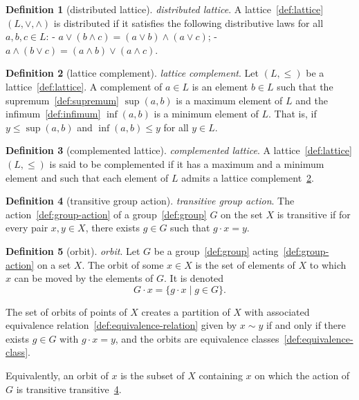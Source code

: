 \documentclass[12pt,a4paper]{article}
\theoremstyle{definition}
\newtheorem{definition}{Definition}
\begin{document}
\begin{definition}[distributed lattice]\label{def:distributed-lattice}
\emph{distributed lattice}. A lattice~\ref{def:lattice} $(L,\lor,\land)$ is distributed if it satisfies the following distributive laws for all $a,b,c\in L$:
- $a\lor (b\land c) = (a\lor b)\land (a\lor c)$;
- $a\land(b\lor c) = (a\land b)\lor (a\land c)$.
\end{definition}

\begin{definition}[lattice complement]\label{def:lattice-complement}
\emph{lattice complement}. Let $(L,\leq)$ be a lattice~\ref{def:lattice}. A complement of $a\in L$ is an element $b\in L$ such that the supremum~\ref{def:supremum} $\sup(a,b)$ is a maximum element of $L$ and the infimum~\ref{def:infimum} $\inf(a,b)$ is a minimum element of $L$. That is, if $y\leq \sup(a,b)$ and $\inf(a,b)\leq y$ for all $y\in L$.
\end{definition}

\begin{definition}[complemented lattice]\label{def:complemented-lattice}
\emph{complemented lattice}. A lattice~\ref{def:lattice} $(L,\leq)$ is said to be complemented if it has a maximum and a minimum element and such that each element of $L$ admits a lattice complement~\ref{def:lattice-complement}.
\end{definition}

\begin{definition}[transitive group action]\label{def:transitive-group-action}
\emph{transitive group action}. The action~\ref{def:group-action} of a group~\ref{def:group} $G$ on the set $X$ is transitive if for every pair $x,y \in X$, there exists $g\in G$ such that $g\cdot x=y$.
\end{definition}

\begin{definition}[orbit]\label{def:orbit}
\emph{orbit}. Let $G$ be a group~\ref{def:group} acting~\ref{def:group-action} on a set $X$. The orbit of some $x \in X$  is the set of elements of $X$ to which $x$ can be moved by the elements of $G$. It is denoted $$G\cdot x = \{g\cdot x \mid g \in G\}.$$

The set of orbits of points of $X$ creates a partition of $X$ with associated equivalence relation~\ref{def:equivalence-relation} given by $x\sim y$ if and only if there exists $g \in G$ with $g\cdot x =y$, and the orbits are equivalence classes~\ref{def:equivalence-class}.

Equivalently, an orbit of $x$ is the subset of $X$ containing $x$ on which the action of $G$ is transitive transitive~\ref{def:transitive-group-action}.
\end{definition}
\end{document}
